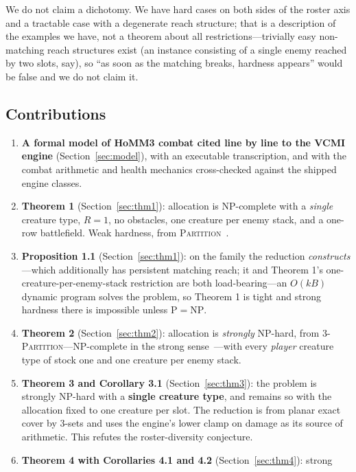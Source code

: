 \documentclass[11pt,a4paper]{article}
\theoremstyle{plain}
\theoremstyle{definition}
\theoremstyle{plain}
\theoremstyle{definition}
\theoremstyle{remark}
\newcommand{\PARTITION}{\textsc{Partition}}
\newcommand{\THREEPART}{\textsc{3-Partition}}
\begin{document}
We do not claim a dichotomy. We have hard cases on both sides of the roster axis and a
tractable case with a degenerate reach structure; that is a description of the examples we
have, not a theorem about all restrictions---trivially easy non-matching reach structures
exist (an instance consisting of a single enemy reached by two slots, say), so ``as soon as the matching breaks, hardness
appears'' would be false and we do not claim it.

\subsection{Contributions}\label{sec:contrib}

\begin{enumerate}
\item \textbf{A formal model of HoMM3 combat cited line by line to the VCMI engine}
  (Section~\ref{sec:model}), with an executable transcription, and with the combat arithmetic
  and health mechanics cross-checked against the shipped engine classes.
\item \textbf{Theorem 1} (Section~\ref{sec:thm1}): allocation is NP-complete with a
  \emph{single} creature type, $R=1$, no obstacles, one creature per enemy stack, and a
  one-row battlefield. Weak hardness, from \PARTITION~\cite[SP12]{GJ79}.
\item \textbf{Proposition 1.1} (Section~\ref{sec:thm1}): on the family the reduction
  \emph{constructs}---which additionally has persistent matching reach; it and Theorem 1's
  one-creature-per-enemy-stack restriction are both load-bearing---an $O(kB)$ dynamic program solves the problem, so
  Theorem 1 is tight and strong hardness there is impossible unless
  $\mathrm{P}=\mathrm{NP}$.
\item \textbf{Theorem 2} (Section~\ref{sec:thm2}): allocation is \emph{strongly} NP-hard, from
  \THREEPART---NP-complete in the strong sense~\cite[SP15]{GJ79}---with every \emph{player}
  creature type of stock one and one creature per enemy stack.
\item \textbf{Theorem 3 and Corollary 3.1} (Section~\ref{sec:thm3}): the problem is strongly
  NP-hard with a \textbf{single creature type}, and remains so with the allocation fixed to
  one creature per slot. The reduction is from planar exact cover by 3-sets and
  uses the engine's lower clamp on damage as its source of arithmetic. This refutes the
  roster-diversity conjecture.
\item \textbf{Theorem 4 with Corollaries 4.1 and 4.2} (Section~\ref{sec:thm4}): strong

\end{enumerate}
\end{document}
